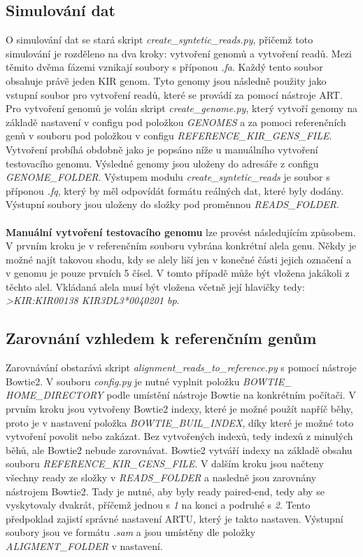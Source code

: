 \documentclass[czech,DP]{thesiskiv}
\numberwithin{equation}{section}
\begin{document}
\subsection{Simulování dat}
O simulování dat se stará skript \textit{create\_syntetic\_reads.py}, přičemž toto simulování je rozděleno na dva kroky: vytvoření genomů a vytvoření readů. Mezi těmito dvěma fázemi vznikají soubory s příponou \textit{.fa}. Každý tento soubor obsahuje právě jeden KIR genom. Tyto genomy jsou následně použity jako vstupní soubor pro vytvoření readů, které se provádí za pomocí nástroje ART. Pro vytvoření genomů je volán skript \textit{create\_genome.py}, který vytvoří genomy na základě nastavení v configu pod položkou \textit{GENOMES} a za pomoci referenčních genů v souboru pod položkou v configu \textit{REFERENCE\_KIR\_GENS\_FILE}. Vytvoření probíhá obdobně jako je popsáno níže u manuálního vytvoření testovacího genomu. Výsledné genomy jsou uloženy do adresáře z configu \textit{GENOME\_FOLDER}. Výstupem modulu \textit{create\_syntetic\_reads} je soubor s příponou \textit{.fq}, který by měl odpovídát formátu reálných dat, které byly dodány. Výstupní soubory jsou uloženy do složky pod proměnnou \textit{READS\_FOLDER}.
\\
\\
\textbf{Manuální vytvoření testovacího genomu} lze provést následujícím způsobem. V prvním kroku je v referenčním souboru vybrána konkrétní alela genu. Někdy je možné najít takovou shodu, kdy se alely liší jen v konečné části jejich označení a v genomu je pouze prvních 5 čísel. V tomto případě může být vložena jakákoli z těchto alel. Vkládaná alela musí být vložena včetně její hlavičky tedy: \textit{>KIR:KIR00138 \: KIR3DL3*0040201  \: bp}.

\subsection{Zarovnání vzhledem k referenčním genům}
Zarovnávání obstarává skript \textit{alignment\_reads\_to\_reference.py} s pomocí nástroje Bowtie2. V souboru \textit{config.py} je nutné vyplnit položku \textit{BOWTIE\_} \\ \textit{HOME\_DIRECTORY} podle umístění nástroje Bowtie na konkrétním počítači. V prvním kroku jsou vytvořeny Bowtie2 indexy, které je možné použít napříč běhy, proto je v nastavení položka \textit{BOWTIE\_BUIL\_INDEX}, díky které je možné toto vytvoření povolit nebo zakázat. Bez vytvořených indexů, tedy indexů z minulých běhů, ale Bowtie2 nebude zarovnávat. Bowtie2 vytváří indexy na základě obsahu souboru \textit{REFERENCE\_KIR\_GENS\_FILE}. V dalším kroku jsou načteny všechny ready ze složky v \textit{READS\_FOLDER} a nasledně jsou zarovnány nástrojem Bowtie2. Tady je nutné, aby byly ready paired-end, tedy aby se vyskytovaly dvakrát, příčemž jednou s \textit{1} na konci a podruhé s \textit{2}. Tento předpoklad zajistí správné nastavení ARTU, který je takto nastaven. Výstupní soubory jsou ve formátu \textit{.sam} a jsou umístěny dle položky \textit{ALIGMENT\_FOLDER} v nastavení. 
\end{document}
